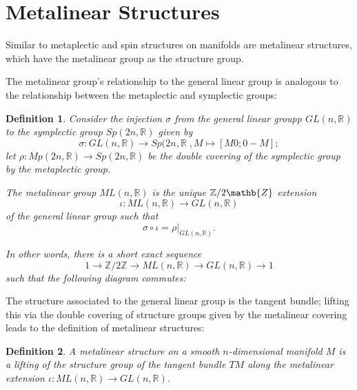\documentclass{tufte-handout}
\newtheorem{defn}{Definition} %
\begin{document}
\section{Metalinear Structures}
Similar to metaplectic and spin structures on manifolds are metalinear structures, which have the metalinear group as the structure group.

The metalinear group's relationship to the general linear group is analogous to the relationship between the metaplectic and symplectic groups:
\begin{fullwidth}
\begin{defn}
Consider the injection $\sigma$ from the general linear groupp $GL(n,\mathbb{R})$ to the symplectic group $Sp(2n,\mathbb{R})$ given by
$$ %
\sigma: GL(n,\mathbb{R}) \to Sp(2n,\mathbb{R} \;, M \mapsto [M 0 ; 0 -M];
$$
let $\rho: Mp(2n, \mathbb{R}) \to Sp(2n, \mathbb{R})$ be the double covering of the symplectic group by the metaplectic group.

The \emph{metalinear group} $ML(n,\mathbb{R})$ is the unique $\mathbb{Z}/2\mathb{Z}$ extension
$$
\iota : ML(n,\mathbb{R}) \to GL(n,\mathbb{R})
$$
of the general linear group such that
$$
\sigma \circ \iota = \rho|_{GL(n,\mathbb{R})}.
$$

In other words, there is a short exact sequence
$$
1 \to \mathbb{Z}/2\mathbb{Z} \to ML(n,\mathbb{R}) \to GL(n,\mathbb{R}) \to 1
$$
such that the following diagram commutes:

\end{defn}
\end{fullwidth}

The structure associated to the general linear group is the tangent bundle; lifting this via the double covering of structure groups given by the metalinear covering leads to the definition of metalinear structures:
\begin{fullwidth}
\begin{defn}
A \emph{metalinear structure} on a smooth $n$-dimensional manifold $M$ is a lifting of the structure group of the tangent bundle $TM$ along the metalinear extension $\iota: ML(n,\mathbb{R}) \to GL(n,\mathbb{R})$.
\end{defn}
\end{fullwidth}
\end{document}
